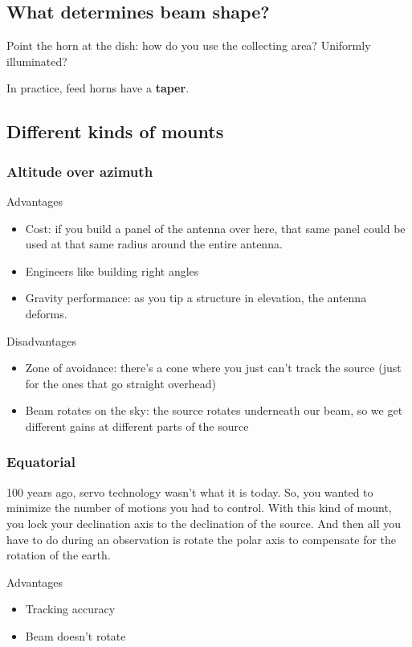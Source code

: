 \documentclass[a4paper]{article}
\begin{document}
\subsection{What determines beam shape?}

Point the horn at the dish: how do you use the collecting area? Uniformly illuminated? 

In practice, feed horns have a \textbf{taper}. 

\subsection{Different kinds of mounts}

\subsubsection{Altitude over azimuth}

Advantages
\begin{itemize}
\item Cost: if you build a panel of the antenna over here, that same panel could be used at that same radius around the entire antenna. 
\item Engineers like building right angles
\item Gravity performance: as you tip a structure in elevation, the antenna deforms. 
\end{itemize}

Disadvantages
\begin{itemize}
\item Zone of avoidance: there's a cone where you just can't track the source (just for the ones that go straight overhead) 
\item Beam rotates on the sky: the source rotates underneath our beam, so we get different gains at different parts of the source
\end{itemize}

\subsubsection{Equatorial}

100 years ago, servo technology wasn't what it is today. So, you wanted to minimize the number of motions you had to control. With this kind of mount, you lock your declination axis to the declination of the source. And then all you have to do during an observation is rotate the polar axis to compensate for the rotation of the earth. 

Advantages
\begin{itemize}
\item Tracking accuracy
\item Beam doesn't rotate
\end{itemize}
\end{document}
